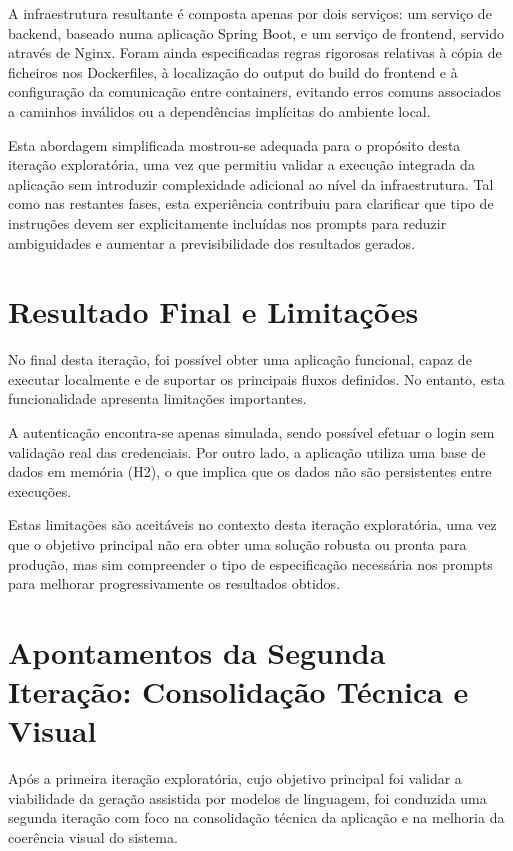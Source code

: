 A infraestrutura resultante é composta apenas por dois serviços: um serviço de backend, baseado numa aplicação Spring Boot, e um serviço de frontend, servido através de Nginx. Foram ainda especificadas regras rigorosas relativas à cópia de ficheiros nos Dockerfiles, à localização do output do build do frontend e à configuração da comunicação entre containers, evitando erros comuns associados a caminhos inválidos ou a dependências implícitas do ambiente local.

Esta abordagem simplificada mostrou-se adequada para o propósito desta iteração exploratória, uma vez que permitiu validar a execução integrada da aplicação sem introduzir complexidade adicional ao nível da infraestrutura. Tal como nas restantes fases, esta experiência contribuiu para clarificar que tipo de instruções devem ser explicitamente incluídas nos prompts para reduzir ambiguidades e aumentar a previsibilidade dos resultados gerados.


\section{Resultado Final e Limitações}

No final desta iteração, foi possível obter uma aplicação funcional, capaz de executar localmente e de suportar os principais fluxos definidos. No entanto, esta funcionalidade apresenta limitações importantes.

A autenticação encontra-se apenas simulada, sendo possível efetuar o login sem validação real das credenciais. Por outro lado, a aplicação utiliza uma base de dados em memória (H2), o que implica que os dados não são persistentes entre execuções.

Estas limitações são aceitáveis no contexto desta iteração exploratória, uma vez que o objetivo principal não era obter uma solução robusta ou pronta para produção, mas sim compreender o tipo de especificação necessária nos prompts para melhorar progressivamente os resultados obtidos.

\section{Apontamentos da Segunda Iteração: Consolidação Técnica e Visual}

Após a primeira iteração exploratória, cujo objetivo principal foi validar a viabilidade da geração assistida por modelos de linguagem, foi conduzida uma segunda iteração com foco na consolidação técnica da aplicação e na melhoria da coerência visual do sistema.

